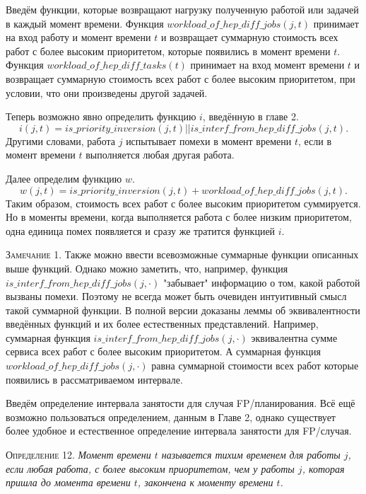 \documentclass[14pt]{matmex-diploma-custom}
\begin{document}
Введём функции, которые возвращают нагрузку полученную работой или задачей
  в каждый момент времени. Функция $workload\_of\_hep\_diff\_jobs(j,t)$ принимает на вход 
  работу и момент времени $t$ и возвращает суммарную стоимость всех работ с более 
  высоким приоритетом, которые появились в момент времени $t$. 
  Функция $workload\_of\_hep\_diff\_tasks(t)$ принимает на вход момент времени $t$ и возвращает 
  суммарную стоимость всех работ с более высоким приоритетом, при условии, что они произведены другой задачей. 

Теперь возможно явно определить функцию $i$, введённую в главе 2.
  $$ i(j,t) = is\_priority\_inversion(j, t) || is\_interf\_from\_hep\_diff\_jobs(j,t).$$
  Другими словами, работа $j$ испытывает помехи в момент времени $t$, если в момент времени 
  $t$ выполняется любая другая работа. 

Далее определим функцию $w$. $$ w(j,t) = is\_priority\_inversion(j, t) + workload\_of\_hep\_diff\_jobs(j,t).$$ 
  Таким образом, стоимость всех работ с более высоким приоритетом суммируется. 
  Но в моменты времени, когда выполняется работа с более низким приоритетом, 
  одна единица помех появляется и сразу же тратится функцией $i$.

\textsc{Замечание 1.} Также можно ввести всевозможные суммарные функции описанных выше функций. 
  Однако можно заметить, что, например, функция $is\_interf\_from\_hep\_diff\_jobs(j,\cdot)$
  "забывает" информацию о том, какой работой вызваны помехи. 
  Поэтому не всегда может быть очевиден интуитивный смысл такой суммарной функции. 
  В полной версии доказаны леммы об эквивалентности введённых функций и их более естественных представлений.
  Например, суммарная функция $is\_interf\_from\_hep\_diff\_jobs(j,\cdot)$ эквивалентна 
  сумме сервиса всех работ с более высоким приоритетом. А суммарная функция 
  $workload\_of\_hep\_diff\_jobs(j,\cdot)$ равна суммарной стоимости всех работ которые появились
  в рассматриваемом интервале.

Введём определение интервала занятости для случая FP\-/планирования. Всё ещё возможно 
  пользоваться определением, данным в Главе 2, однако существует 
  более удобное и естественное определение интервала занятости для FP\-/случая.

\textsc{Определение 12.}
\textit{Момент времени $t$ называется тихим временем для работы $j$, если 
  любая работа, с более высоким приоритетом, чем у работы $j$, 
  которая пришла до момента времени $t$, закончена к моменту времени $t$. }
\end{document}
